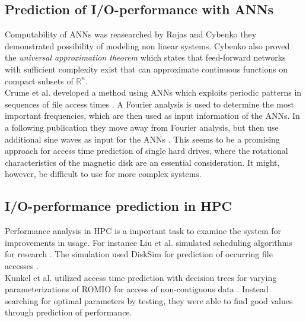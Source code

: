 \documentclass{superfri}
\begin{document}
\subsection{Prediction of I/O-performance with ANNs}
Computability of ANNs was reasearched by Rojas \cite{Rojas:1996:NNS:235222} and Cybenko \cite{cybenko:mcss} they demonstrated possibility of modeling non linear systems. Cybenko also proved the \textit{universal approximation theorem} which states that feed-forward networks with sufficient complexity exist that can approximate continuous functions on compact subsets of $\mathbb{R}^n$.\\
Crume et al. developed a method using ANNs which exploits periodic patterns in sequences of file access times \cite{Crume:2013:FML:2538542.2538561}.
A Fourier analysis is used to determine the most important frequencies, which are then used as input information of the ANNs.
In a following publication they move away from Fourier analysis, but then use additional sine waves as input for the ANNs \cite{crumelatent}.
This seems to be a promising approach for access time prediction of single hard drives, where the rotational characteristics of the magnetic disk are an essential consideration. It might, however, be difficult to use for more complex systems.

\subsection{I/O-performance prediction in HPC}
Performance analysis in HPC is a important task to examine the system for improvements in usage.
For instance Liu et al. simulated scheduling algorithms for research \cite{liu2011towards}. 
The simulation used DiskSim for prediction of occurring file accesses \cite{Bucy08thedisksim}.\\
Kunkel et al. utilized access time prediction with decision trees for varying parameterizations of ROMIO for access of non-contiguous data \cite{UMLTPTPONI15}. Instead searching for optimal parameters by testing, they were able to find good values through prediction of performance.
\end{document}
